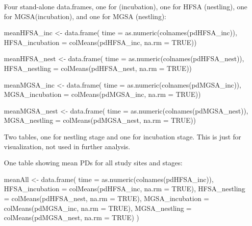 \documentclass[
]{article}
\newenvironment{Shaded}{\begin{snugshade}}{\end{snugshade}}
\newcommand{\AttributeTok}[1]{\textcolor[rgb]{0.77,0.63,0.00}{#1}}
\newcommand{\ConstantTok}[1]{\textcolor[rgb]{0.00,0.00,0.00}{#1}}
\newcommand{\FunctionTok}[1]{\textcolor[rgb]{0.00,0.00,0.00}{#1}}
\newcommand{\NormalTok}[1]{#1}
\newcommand{\OtherTok}[1]{\textcolor[rgb]{0.56,0.35,0.01}{#1}}
\begin{document}
Four stand-alone data.frames, one for (incubation), one for HFSA
(nestling), one for MGSA(incubation), and one for MGSA (nestling):

\begin{Shaded}
\begin{Highlighting}[]
\NormalTok{meanHFSA\_inc }\OtherTok{\textless{}{-}} \FunctionTok{data.frame}\NormalTok{(}
  \AttributeTok{time =} \FunctionTok{as.numeric}\NormalTok{(}\FunctionTok{colnames}\NormalTok{(pdHFSA\_inc)),}
  \AttributeTok{HFSA\_incubation =} \FunctionTok{colMeans}\NormalTok{(pdHFSA\_inc, }\AttributeTok{na.rm =} \ConstantTok{TRUE}\NormalTok{))}

\NormalTok{meanHFSA\_nest }\OtherTok{\textless{}{-}} \FunctionTok{data.frame}\NormalTok{(}
  \AttributeTok{time =} \FunctionTok{as.numeric}\NormalTok{(}\FunctionTok{colnames}\NormalTok{(pdHFSA\_nest)),}
  \AttributeTok{HFSA\_nestling =} \FunctionTok{colMeans}\NormalTok{(pdHFSA\_nest, }\AttributeTok{na.rm =} \ConstantTok{TRUE}\NormalTok{))}

\NormalTok{meanMGSA\_inc }\OtherTok{\textless{}{-}} \FunctionTok{data.frame}\NormalTok{(}
  \AttributeTok{time =} \FunctionTok{as.numeric}\NormalTok{(}\FunctionTok{colnames}\NormalTok{(pdMGSA\_inc)),}
  \AttributeTok{MGSA\_incubation =} \FunctionTok{colMeans}\NormalTok{(pdMGSA\_inc, }\AttributeTok{na.rm =} \ConstantTok{TRUE}\NormalTok{))}

\NormalTok{meanMGSA\_nest }\OtherTok{\textless{}{-}} \FunctionTok{data.frame}\NormalTok{(}
  \AttributeTok{time =} \FunctionTok{as.numeric}\NormalTok{(}\FunctionTok{colnames}\NormalTok{(pdMGSA\_nest)),}
  \AttributeTok{MGSA\_nestling =} \FunctionTok{colMeans}\NormalTok{(pdMGSA\_nest, }\AttributeTok{na.rm =} \ConstantTok{TRUE}\NormalTok{))}
\end{Highlighting}
\end{Shaded}

Two tables, one for nestling stage and one for incubation stage. This is
just for visualization, not used in further analysis.

One table showing mean PDs for all study sites and stages:

\begin{Shaded}
\begin{Highlighting}[]
\NormalTok{meanAll }\OtherTok{\textless{}{-}} \FunctionTok{data.frame}\NormalTok{(}
  \AttributeTok{time =} \FunctionTok{as.numeric}\NormalTok{(}\FunctionTok{colnames}\NormalTok{(pdHFSA\_inc)),}
  \AttributeTok{HFSA\_incubation =} \FunctionTok{colMeans}\NormalTok{(pdHFSA\_inc, }\AttributeTok{na.rm =} \ConstantTok{TRUE}\NormalTok{),}
  \AttributeTok{HFSA\_nestling =} \FunctionTok{colMeans}\NormalTok{(pdHFSA\_nest, }\AttributeTok{na.rm =} \ConstantTok{TRUE}\NormalTok{),}
  \AttributeTok{MGSA\_incubation =} \FunctionTok{colMeans}\NormalTok{(pdMGSA\_inc, }\AttributeTok{na.rm =} \ConstantTok{TRUE}\NormalTok{),}
  \AttributeTok{MGSA\_nestling =} \FunctionTok{colMeans}\NormalTok{(pdMGSA\_nest, }\AttributeTok{na.rm =} \ConstantTok{TRUE}\NormalTok{)}
\NormalTok{)}
\end{Highlighting}
\end{Shaded}
\end{document}
